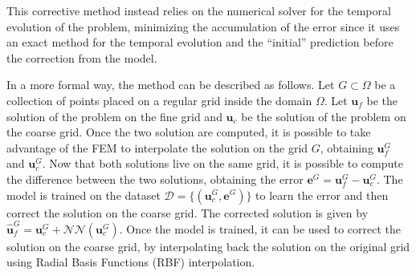 This corrective method instead relies on the numerical solver for the temporal evolution of the problem, minimizing the accumulation of the error since it uses an exact method for the temporal evolution and the ``initial'' prediction before the correction from the model.

In a more formal way, the method can be described as follows. Let \(G \subset \Omega\) be a collection of points placed on a regular grid inside the domain \(\Omega\). Let \(\bm{u}_f\) be the solution of the problem on the fine grid and \(\bm{u}_c\) be the solution of the problem on the coarse grid. Once the two solution are computed, it is possible to take advantage of the FEM to interpolate the solution on the grid \(G\), obtaining \(\bm{u}_f^G\) and \(\bm{u}_c^G\). Now that both solutions live on the same grid, it is possible to compute the difference between the two solutions, obtaining the error \(\bm{e}^G = \bm{u}_f^G - \bm{u}_c^G\). The model is trained on the dataset \(\mathcal{D} = \{(\bm{u}_c^G, \bm{e}^G)\}\) to learn the error and then correct the solution on the coarse grid. The corrected solution is given by \(\hat{\bm{u}}_f^G = \bm{u}_c^G + \mathcal{NN}(\bm{u}_c^G)\). Once the model is trained, it can be used to correct the solution on the coarse grid, by interpolating back the solution on the original grid using Radial Basis Functions (RBF) interpolation.